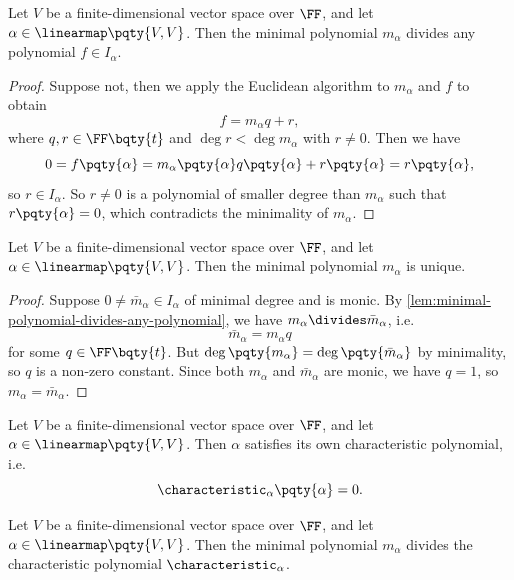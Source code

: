 \begin{lemma}
    \label{lem:minimal-polynomial-divides-any-polynomial}%
    Let \(V\) be a finite-dimensional vector space over \(\FF\), and let \(\alpha \in \linearmap\pqty{V, V}\). Then the minimal polynomial \(m_\alpha\) divides any polynomial \(f \in I_\alpha\).
\end{lemma}

\begin{proof}
    Suppose not, then we apply the Euclidean algorithm to \(m_\alpha\) and \(f\) to obtain
    \[
        f = m_\alpha q + r,
    \]
    where \(q, r \in \FF\bqty{t}\) and \(\deg r < \deg m_\alpha\) with \(r \neq 0\). Then we have
    \[
        0 = f\pqty{\alpha} = m_\alpha\pqty{\alpha} q\pqty{\alpha} + r\pqty{\alpha} = r\pqty{\alpha},
    \]
    so \(r \in I_\alpha\). So \(r \neq 0\) is a polynomial of smaller degree than \(m_\alpha\) such that \(r\pqty{\alpha} = 0\), which contradicts the minimality of \(m_\alpha\).
\end{proof}

\begin{proposition}
    Let \(V\) be a finite-dimensional vector space over \(\FF\), and let \(\alpha \in \linearmap\pqty{V, V}\). Then the minimal polynomial \(m_\alpha\) is unique.
\end{proposition}

\begin{proof}
    Suppose \(0 \neq \bar{m}_{\alpha} \in I_{\alpha}\) of minimal degree and is monic. By \autoref{lem:minimal-polynomial-divides-any-polynomial}, we have \(m_\alpha \divides \bar{m}_\alpha\), i.e.
    \[
        \bar{m}_\alpha = m_\alpha q
    \]
    for some \(q \in \FF\bqty{t}\). But \(\deg \pqty{m_\alpha} = \deg \pqty{\bar{m}_\alpha}\) by minimality, so \(q\) is a non-zero constant. Since both \(m_\alpha\) and \(\bar{m}_\alpha\) are monic, we have \(q = 1\), so \(m_\alpha = \bar{m}_\alpha\).
\end{proof}

\begin{theorem}
    \label{thm:cayley-hamilton-theorem}%
    Let \(V\) be a finite-dimensional vector space over \(\FF\), and let \(\alpha \in \linearmap\pqty{V, V}\). Then \(\alpha\) satisfies its own characteristic polynomial, i.e.
    \[
        \characteristic_{\alpha}\pqty{\alpha} = 0.
    \]
\end{theorem}

\begin{corollary}
    Let \(V\) be a finite-dimensional vector space over \(\FF\), and let \(\alpha \in \linearmap\pqty{V, V}\). Then the minimal polynomial \(m_\alpha\) divides the characteristic polynomial \(\characteristic_{\alpha}\).
\end{corollary}

